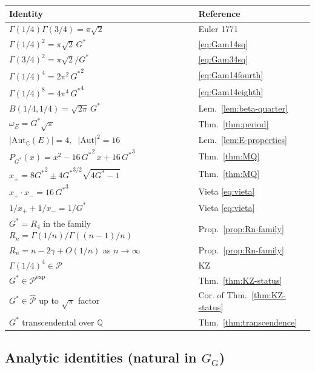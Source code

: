 \documentclass[11pt]{article}
\theoremstyle{definition}
\theoremstyle{remark}
\newcommand{\Gs}{G^{*}}
\newcommand{\Gss}{{G^{*}}^{2}}
\newcommand{\Gsss}{{G^{*}}^{3}}
\newcommand{\GG}{G_{\!\scriptscriptstyle\mathrm{G}}}
\newcommand{\Q}{\mathbb{Q}}
\newcommand{\C}{\mathbb{C}}
\newcommand{\Aut}{\mathrm{Aut}}
\begin{document}
\begin{center}
\begin{tabular}{p{}p{}}
\toprule
Identity & Reference \\
\midrule
$\Gamma(1/4)\Gamma(3/4) = \pi\sqrt 2$ & Euler 1771 \\
$\Gamma(1/4)^2 = \pi\sqrt 2\,\Gs$ & \eqref{eq:Gam14sq} \\
$\Gamma(3/4)^2 = \pi\sqrt 2/\Gs$ & \eqref{eq:Gam34sq} \\
$\Gamma(1/4)^4 = 2\pi^2\,\Gss$ & \eqref{eq:Gam14fourth} \\
$\Gamma(1/4)^8 = 4\pi^4\,{\Gs}^4$ & \eqref{eq:Gam14eighth} \\
$B(1/4, 1/4) = \sqrt{2\pi}\,\Gs$ & Lem.~\ref{lem:beta-quarter} \\
$\omega_E = \Gs\sqrt\pi$ & Thm.~\ref{thm:period} \\
$|\Aut_\C(E)| = 4,\;\;|\Aut|^2 = 16$ & Lem.~\ref{lem:E-properties} \\
$P_{\!\Gs}(x) = x^2 - 16\,\Gss\,x + 16\,\Gsss$ & Thm.~\ref{thm:MQ} \\
$x_\pm = 8\Gss \pm 4{\Gs}^{3/2}\sqrt{4\Gs - 1}$ & Thm.~\ref{thm:MQ} \\
$x_+ \cdot x_- = 16\,\Gsss$ & Vieta \eqref{eq:vieta} \\
$1/x_+ + 1/x_- = 1/\Gs$ & Vieta \eqref{eq:vieta} \\
$\Gs = R_4$ in the family $R_n = \Gamma(1/n)/\Gamma((n-1)/n)$ & Prop.~\ref{prop:Rn-family} \\
$R_n = n - 2\gamma + O(1/n)$ as $n\to\infty$ & Prop.~\ref{prop:Rn-family} \\
$\Gamma(1/4)^4 \in \mathcal{P}$ & KZ \cite[Eq.~6]{kontsevich-zagier} \\
$\Gs \in \mathcal{P}^{\exp}$ & Thm.~\ref{thm:KZ-status} \\
$\Gs \in \widehat{\mathcal{P}}$ up to $\sqrt\pi$ factor & Cor. of Thm.~\ref{thm:KZ-status} \\
$\Gs$ transcendental over $\Q$ & Thm.~\ref{thm:transcendence} \\
\bottomrule
\end{tabular}
\end{center}

\subsection{Analytic identities (natural in $\GG$)}
\end{document}
